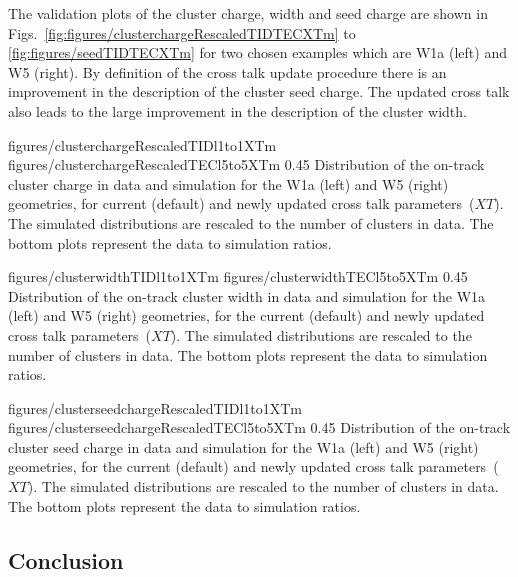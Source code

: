 The validation plots of the cluster charge, width and seed charge are shown in Figs.~\ref{fig:figures/clusterchargeRescaledTIDTECXTm} to \ref{fig:figures/seedTIDTECXTm} for two chosen examples which are W1a (left) and W5 (right). By definition of the cross talk update procedure there is an improvement in the description of the cluster seed charge. The updated cross talk also leads to the large improvement in the description of the cluster width.

                 {figures/clusterchargeRescaledTIDl1to1XTm} %
                 {figures/clusterchargeRescaledTECl5to5XTm} %
                 {0.45}       %
                 { Distribution of the on-track cluster charge in data and simulation for the W1a (left) and W5 (right) geometries, for current (default) and newly updated cross talk parameters~($XT$).  The simulated distributions are rescaled to the number of clusters in data.  The bottom plots represent the data to simulation ratios. }

                 {figures/clusterwidthTIDl1to1XTm}
                 {figures/clusterwidthTECl5to5XTm}
                 {0.45}       %
                 { Distribution of the on-track cluster width in data and simulation for the W1a (left) and W5 (right) geometries, for the current (default) and newly updated cross talk parameters~($XT$).  The simulated distributions are rescaled to the number of clusters in data.  The bottom plots represent the data to simulation ratios. }

                 {figures/clusterseedchargeRescaledTIDl1to1XTm} %
                 {figures/clusterseedchargeRescaledTECl5to5XTm} %
                 {0.45}       %
                 { Distribution of the on-track cluster seed charge in data and simulation for the W1a (left) and W5 (right) geometries, for the current (default) and newly updated cross talk parameters~($XT$).  The simulated distributions are rescaled to the number of clusters in data.  The bottom plots represent the data to simulation ratios. }

\newpage

\subsection{Conclusion}

